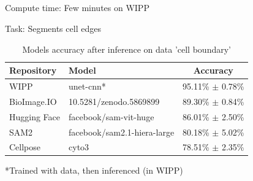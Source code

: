 \subsection{\slidetitle}
\begin{frame}
  \frametitle{\sectiontitle}
  \framesubtitle{\slidetitle}

  Compute time: Few minutes on WIPP

  Task: Segments cell edges

  \begin{center}
    \begin{table}
      \begin{tabular}{|l|l|c|}
       \hline
       \rowcolor{tableFirstRowColor}  Repository    & Model                       & Accuracy \\ [0.5ex]
       \hline
       \cellcolor{tableFirstColColor} WIPP          & unet-cnn*                   & 95.11\% $\pm$ 0.78\% \\
       \hline
       \cellcolor{tableFirstColColor} BioImage.IO   & 10.5281/zenodo.5869899      & 89.30\% $\pm$ 0.84\% \\
       \hline
       \cellcolor{tableFirstColColor} Hugging Face  & facebook/sam-vit-huge       & 86.01\% $\pm$ 2.50\% \\
       \hline
       \cellcolor{tableFirstColColor} SAM2          & facebook/sam2.1-hiera-large & 80.18\% $\pm$ 5.02\% \\
       \hline
       \cellcolor{tableFirstColColor} Cellpose      & cyto3                       & 78.51\% $\pm$ 2.35\% \\
       \hline
      \end{tabular}
      \caption{Models accuracy after inference on data 'cell boundary'}
    \end{table}
  \end{center}

  *Trained with data, then inferenced (in WIPP)

\end{frame}

\def\slidetitle{Data 'nuclei segmentation'}


